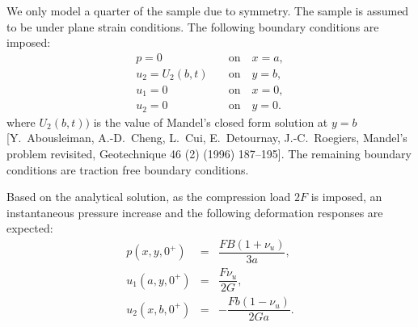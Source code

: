 \documentclass{elsarticle}
\begin{document}
	
	We only model a quarter of the sample due to symmetry. The sample is assumed to be under plane strain conditions. The following boundary conditions are imposed:
	\begin{eqnarray*}
	p=0 \quad &\text{on}  \quad x=a, \\
	u_2=U_2(b,t) \quad &\text{on}\quad y=b,\\
	u_1=0 \quad &\text{on} \quad x=0,\\
	u_2=0 \quad &\text{on} \quad y=0.
	\end{eqnarray*}
where $U_2(b,t))$ is the value of Mandel's closed form solution at $y =  b$ [Y.~Abousleiman, A.-D.~Cheng, L.~Cui, E.~Detournay, J.-C.~Roegiers, Mandel's problem revisited, Geotechnique 46 (2) (1996) 187–195].
The remaining boundary conditions are traction free boundary conditions.

	
	
%	
	
	Based on the analytical solution, as the compression load $2F$ is imposed, an instantaneous pressure increase and the following deformation responses are expected:	
	\begin{eqnarray*}
		p(x, y, 0^+) &=&\dfrac{FB(1+\nu_u)}{3a},\\
		u_1(a, y, 0^+) &=&\dfrac{F\nu_u}{2G},\\
		u_2(x, b, 0^+) &=&-\dfrac{Fb(1-\nu_u)}{2Ga}.
	\end{eqnarray*}
	
\end{document}
